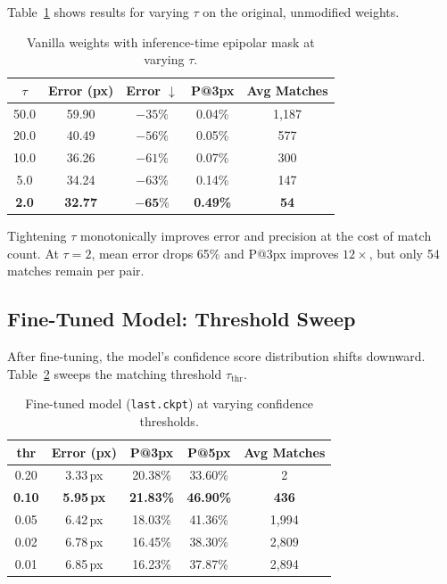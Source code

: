 \documentclass[10pt]{article}
\begin{document}
Table~\ref{tab:tau} shows results for varying $\tau$ on the original, unmodified weights.

\begin{table}[H]
\centering
\caption{Vanilla weights with inference-time epipolar mask at varying $\tau$.}
\label{tab:tau}
\small
\setlength{\tabcolsep}{4pt}
\begin{tabular}{ccccc}
\toprule
$\tau$ & Error (px) & Error $\downarrow$ & P@3px & Avg Matches \\
\midrule
50.0       & 59.90  & $-35\%$ & 0.04\% & 1,187 \\
20.0       & 40.49  & $-56\%$ & 0.05\% & 577   \\
10.0       & 36.26  & $-61\%$ & 0.07\% & 300   \\
5.0        & 34.24  & $-63\%$ & 0.14\% & 147   \\
\textbf{2.0} & \textbf{32.77} & $\mathbf{-65\%}$ & \textbf{0.49\%} & \textbf{54} \\
\bottomrule
\end{tabular}
\end{table}

Tightening $\tau$ monotonically improves error and precision at the cost of match count. At $\tau = 2$, mean error drops 65\% and P@3px improves $12\times$, but only 54 matches remain per pair.

\subsection{Fine-Tuned Model: Threshold Sweep}

After fine-tuning, the model's confidence score distribution shifts downward. Table~\ref{tab:thr} sweeps the matching threshold $\tau_{\text{thr}}$.

\begin{table}[H]
\centering
\caption{Fine-tuned model (\texttt{last.ckpt}) at varying confidence thresholds.}
\label{tab:thr}
\small
\setlength{\tabcolsep}{4pt}
\begin{tabular}{ccccc}
\toprule
thr & Error (px) & P@3px & P@5px & Avg Matches \\
\midrule
0.20       & 3.33\,px & 20.38\% & 33.60\% & 2     \\
\textbf{0.10} & \textbf{5.95\,px} & \textbf{21.83\%} & \textbf{46.90\%} & \textbf{436} \\
0.05       & 6.42\,px & 18.03\% & 41.36\% & 1,994 \\
0.02       & 6.78\,px & 16.45\% & 38.30\% & 2,809 \\
0.01       & 6.85\,px & 16.23\% & 37.87\% & 2,894 \\
\bottomrule
\end{tabular}
\end{table}
\end{document}
